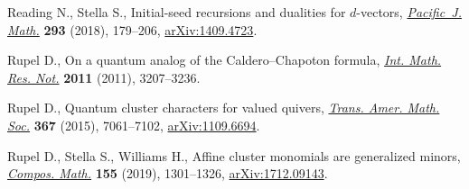 \documentclass[pdftex]{sigma}
\numberwithin{equation}{section}
\begin{document}
\begin{thebibliography}{99}
Reading N., Stella S., Initial-seed recursions and dualities for {$d$}-vectors,
 \href{https://doi.org/10.2140/pjm.2018.293.179}{\textit{Pacific~J. Math.}} \textbf{293} (2018), 179--206, \href{https://arxiv.org/abs/1409.4723}{arXiv:1409.4723}.

Rupel D., On a quantum analog of the {C}aldero--{C}hapoton formula,
 \href{https://doi.org/10.1093/imrn/rnq192}{\textit{Int. Math. Res. Not.}} \textbf{2011} (2011), 3207--3236.

Rupel D., Quantum cluster characters for valued quivers, \href{https://doi.org/10.1090/S0002-9947-2015-06251-5}{\textit{Trans. Amer.
 Math. Soc.}} \textbf{367} (2015), 7061--7102, \href{https://arxiv.org/abs/1109.6694}{arXiv:1109.6694}.

Rupel D., Stella S., Williams H., Affine cluster monomials are generalized
 minors, \href{https://doi.org/10.1112/s0010437x19007292}{\textit{Compos. Math.}} \textbf{155} (2019), 1301--1326,
 \href{https://arxiv.org/abs/1712.09143}{arXiv:1712.09143}.

\end{thebibliography}\LastPageEnding
\end{document}
